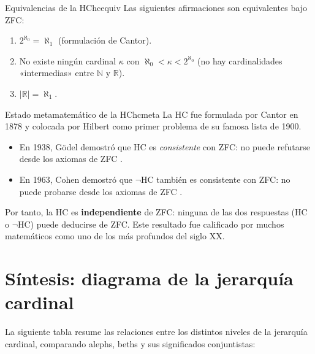 \begin{observacion}{Equivalencias de la HC}{hcequiv}
Las siguientes afirmaciones son equivalentes bajo ZFC:
\begin{enumerate}[leftmargin=2em, label=(\roman*)]
  \item $2^{\aleph_0} = \aleph_1$ (formulación de Cantor).
  \item No existe ningún cardinal $\kappa$ con $\aleph_0 < \kappa < 2^{\aleph_0}$ (no hay cardinalidades «intermedias» entre $\mathbb{N}$ y $\mathbb{R}$).
  \item $|\mathbb{R}| = \aleph_1$.
\end{enumerate}
\end{observacion}

\begin{observacion}{Estado metamatemático de la HC}{hcmeta}
La HC fue formulada por Cantor en 1878 y colocada por Hilbert como primer problema de su famosa lista de 1900.
\begin{itemize}[leftmargin=2em]
  \item En 1938, Gödel demostró que HC es \emph{consistente} con ZFC: no puede refutarse desde los axiomas de ZFC \cite{godel1940}.
  \item En 1963, Cohen demostró que $\neg$HC también es consistente con ZFC: no puede probarse desde los axiomas de ZFC \cite{cohen1966}.
\end{itemize}
Por tanto, la HC es \textbf{independiente} de ZFC: ninguna de las dos respuestas (HC o $\neg$HC) puede deducirse de ZFC. Este resultado fue calificado por muchos matemáticos como uno de los más profundos del siglo XX.
\end{observacion}

\section{Síntesis: diagrama de la jerarquía cardinal}

La siguiente tabla resume las relaciones entre los distintos niveles de la jerarquía cardinal, comparando alephs, beths y sus significados conjuntistas:

